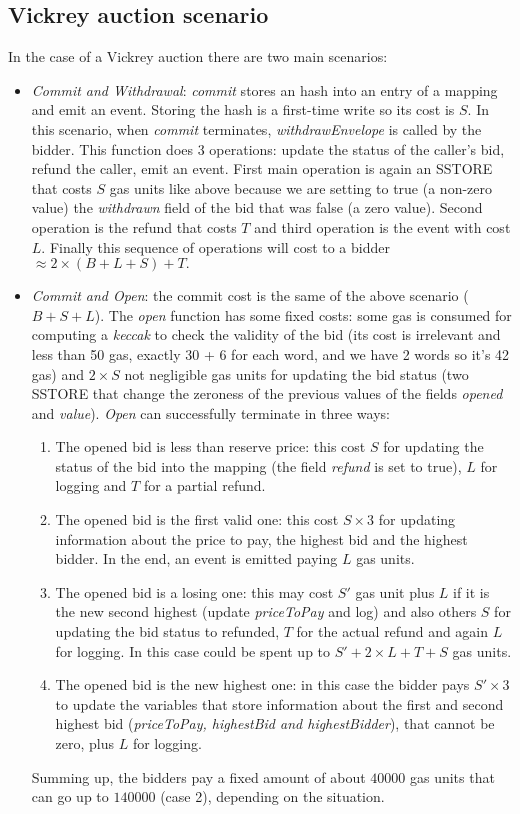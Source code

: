 \documentclass{article}
\begin{document}
\subsection{Vickrey auction scenario}
In the case of a Vickrey auction there are two main scenarios:
    \begin{itemize}
        \item \textit{Commit and Withdrawal}: \textit{commit} stores an hash into an entry of a mapping and emit an event. Storing the hash is a first-time write so its cost is $S$. In this scenario, when \textit{commit} terminates, \textit{withdrawEnvelope} is called by the bidder. This function does 3 operations: update the status of the caller's bid, refund the caller, emit an event. First main operation is again an SSTORE that costs $S$ gas units like above because we are setting to true (a non-zero value) the \textit{withdrawn} field of the bid that was false (a zero value). Second operation is the refund that costs $T$ and third operation is the event with cost $L$. Finally this sequence of operations will cost to a bidder $\approx 2\times (B + L + S) + T.$
        \item \textit{Commit and Open}: the commit cost is the same of the above scenario ($B+S+L$). The \textit{open} function has some fixed costs: some gas is consumed for computing a \textit{keccak} to check the validity of the bid (its cost is irrelevant and less than 50 gas, exactly 30 + 6 for each word, and we have 2 words so it's 42 gas) and $2\times S$ not negligible gas units for updating the bid status (two SSTORE that change the zeroness of the previous values of the fields \textit{opened} and \textit{value}). \textit{Open} can successfully terminate in three ways:
        \begin{enumerate}
            \item The opened bid is less than reserve price: this cost $S$ for updating the status of the bid into the mapping (the field \textit{refund} is set to true), $L$ for logging and $T$ for a partial refund.
            \item The opened bid is the first valid one: this cost $S \times 3$ for updating information about the price to pay, the highest bid and the highest bidder. In the end, an event is emitted paying $L$ gas units.
            \item The opened bid is a losing one: this may cost $S'$ gas unit plus $L$ if it is the new second highest (update \textit{priceToPay} and log) and also others $S$ for updating the bid status to refunded, $T$ for the actual refund and again $L$ for logging. In this case could be spent up to $S'+2\times L + T + S$ gas units.
            \item The opened bid is the new highest one: in this case the bidder pays $S' \times 3$ to update the variables that store information about the first and second highest bid (\textit{priceToPay, highestBid and highestBidder}), that cannot be zero, plus $L$ for logging.
        \end{enumerate}
        Summing up, the bidders pay a fixed amount of about $40000$ gas units that can go up to $140000$ (case 2), depending on the situation.
    \end{itemize}
    
\end{document}
